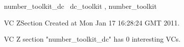 \documentclass{article}
\begin{document}

\begin{zsection}
	 \SECTION number\_toolkit\_dc \parents~dc\_toolkit , number\_toolkit
\end{zsection}

\newcommand{\appliesTo}{\zbinop{appliesTo}} 
\newcommand{\appliesToNofix}{\zpreop{appliesToNofix}} 

VC ZSection Created at Mon Jan 17 16:28:24 GMT 2011.



 VC Z section "number_toolkit_dc" has $0$ interesting VCs.



\end{document}

